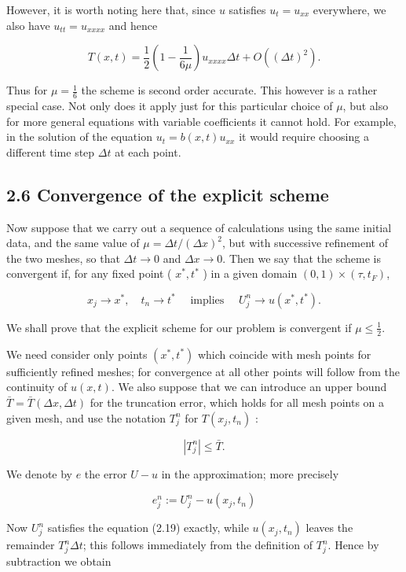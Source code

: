 \documentclass[10pt]{article}
\begin{document}
However, it is worth noting here that, since \(u\) satisfies \(u_{t}=u_{x x}\) everywhere, we also have \(u_{t t}=u_{x x x x}\) and hence

\[
T(x, t)=\frac{1}{2}\left(1-\frac{1}{6 \mu}\right) u_{x x x x} \Delta t+O\left((\Delta t)^{2}\right) .
\]

Thus for \(\mu=\frac{1}{6}\) the scheme is second order accurate. This however is a rather special case. Not only does it apply just for this particular choice of \(\mu\), but also for more general equations with variable coefficients it cannot hold. For example, in the solution of the equation \(u_{t}=b(x, t) u_{x x}\) it would require choosing a different time step \(\Delta t\) at each point.

\subsection*{2.6 Convergence of the explicit scheme}
Now suppose that we carry out a sequence of calculations using the same initial data, and the same value of \(\mu=\Delta t /(\Delta x)^{2}\), but with successive refinement of the two meshes, so that \(\Delta t \rightarrow 0\) and \(\Delta x \rightarrow 0\). Then we say that the scheme is convergent if, for any fixed point ( \(x^{*}, t^{*}\) ) in a given domain \((0,1) \times\left(\tau, t_{F}\right)\),

\[
x_{j} \rightarrow x^{*}, \quad t_{n} \rightarrow t^{*} \quad \text { implies } \quad U_{j}^{n} \rightarrow u\left(x^{*}, t^{*}\right) .
\]

We shall prove that the explicit scheme for our problem is convergent if \(\mu \leq \frac{1}{2}\).

We need consider only points \(\left(x^{*}, t^{*}\right)\) which coincide with mesh points for sufficiently refined meshes; for convergence at all other points will follow from the continuity of \(u(x, t)\). We also suppose that we can introduce an upper bound \(\bar{T}=\bar{T}(\Delta x, \Delta t)\) for the truncation error, which holds for all mesh points on a given mesh, and use the notation \(T_{j}^{n}\) for \(T\left(x_{j}, t_{n}\right)\) :

\[
\left|T_{j}^{n}\right| \leq \bar{T} .
\]

We denote by \(e\) the error \(U-u\) in the approximation; more precisely

\[
e_{j}^{n}:=U_{j}^{n}-u\left(x_{j}, t_{n}\right)
\]

Now \(U_{j}^{n}\) satisfies the equation (2.19) exactly, while \(u\left(x_{j}, t_{n}\right)\) leaves the remainder \(T_{j}^{n} \Delta t\); this follows immediately from the definition of \(T_{j}^{n}\). Hence by subtraction we obtain
\end{document}
